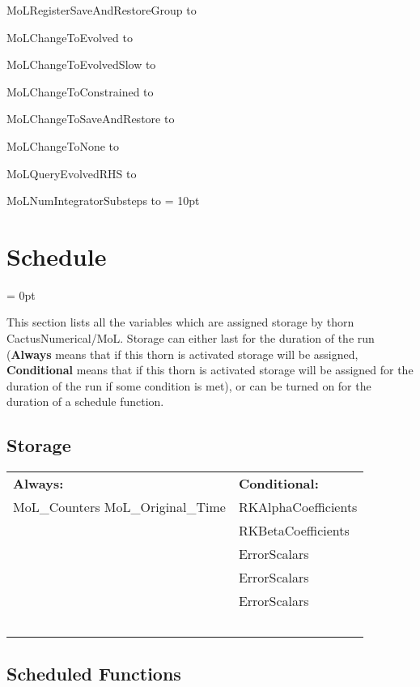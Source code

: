 MoLRegisterSaveAndRestoreGroup to 

MoLChangeToEvolved to 

MoLChangeToEvolvedSlow to 

MoLChangeToConstrained to 

MoLChangeToSaveAndRestore to 

MoLChangeToNone to 

MoLQueryEvolvedRHS to 

MoLNumIntegratorSubsteps to 
\vspace{2mm}\parskip = 10pt 

\section{Schedule} 


\parskip = 0pt


\noindent This section lists all the variables which are assigned storage by thorn CactusNumerical/MoL.  Storage can either last for the duration of the run ({\bf Always} means that if this thorn is activated storage will be assigned, {\bf Conditional} means that if this thorn is activated storage will be assigned for the duration of the run if some condition is met), or can be turned on for the duration of a schedule function.


\subsection*{Storage}

\hspace{5mm}

 \begin{tabular*}{160mm}{ll} 

{\bf Always:}& {\bf Conditional:} \\ 
 MoL\_Counters MoL\_Original\_Time &  RKAlphaCoefficients\\ 
~ &  RKBetaCoefficients\\ 
~ &  ErrorScalars\\ 
~ &  ErrorScalars\\ 
~ &  ErrorScalars\\ 
~ & ~\\ 
\end{tabular*} 


\subsection*{Scheduled Functions}
\vspace{5mm}


